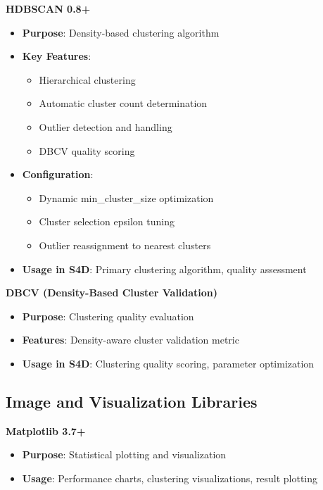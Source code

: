 \textbf{HDBSCAN 0.8+}
\begin{itemize}
    \item \textbf{Purpose}: Density-based clustering algorithm
    \item \textbf{Key Features}:
        \begin{itemize}
            \item Hierarchical clustering
            \item Automatic cluster count determination
            \item Outlier detection and handling
            \item DBCV quality scoring
        \end{itemize}
    \item \textbf{Configuration}:
        \begin{itemize}
            \item Dynamic min\_cluster\_size optimization
            \item Cluster selection epsilon tuning
            \item Outlier reassignment to nearest clusters
        \end{itemize}
    \item \textbf{Usage in S4D}: Primary clustering algorithm, quality assessment
\end{itemize}

\textbf{DBCV (Density-Based Cluster Validation)}
\begin{itemize}
    \item \textbf{Purpose}: Clustering quality evaluation
    \item \textbf{Features}: Density-aware cluster validation metric
    \item \textbf{Usage in S4D}: Clustering quality scoring, parameter optimization
\end{itemize}

\subsection{Image and Visualization Libraries}
\label{subsec:visualization-libs}

\textbf{Matplotlib 3.7+}
\begin{itemize}
    \item \textbf{Purpose}: Statistical plotting and visualization
    \item \textbf{Usage}: Performance charts, clustering visualizations, result plotting
\end{itemize}

